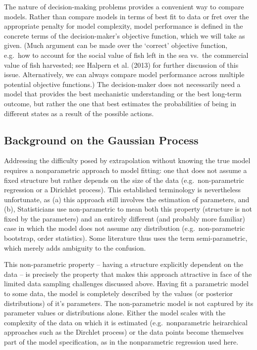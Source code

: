 \documentclass[author-year, review]{elsarticle} %
\begin{document}
The nature of decision-making problems provides a convenient way to
compare models. Rather than compare models in terms of best fit to data
or fret over the appropriate penalty for model complexity, model
performance is defined in the concrete terms of the decision-maker's
objective function, which we will take as given. (Much argument can be
made over the `correct' objective function, e.g.~how to account for the
social value of fish left in the sea vs.~the commercial value of fish
harvested; see Halpern et al. (2013) for further discussion of this
issue. Alternatively, we can always compare model performance across
multiple potential objective functions.) The decision-maker does not
necessarily need a model that provides the best mechanistic
understanding or the best long-term outcome, but rather the one that
best estimates the probabilities of being in different states as a
result of the possible actions.

\subsection{Background on the Gaussian
Process}\label{background-on-the-gaussian-process}

Addressing the difficulty posed by extrapolation without knowing the
true model requires a nonparametric approach to model fitting: one that
does not assume a fixed structure but rather depends on the size of the
data (e.g.~non-parametric regression or a Dirichlet process). This
established terminology is nevertheless unfortunate, as (a) this
approach still involves the estimation of parameters, and (b),
Statisticians use non-parametric to mean both this property (structure
is not fixed by the parameters) and an entirely different (and probably
more familiar) case in which the model does not assume any distribution
(e.g.~non-parametric bootstrap, order statistics). Some literature thus
uses the term semi-parametric, which merely adds ambiguity to the
confusion.

This non-parametric property -- having a structure explicitly dependent
on the data -- is precisely the property that makes this approach
attractive in face of the limited data sampling challenges discussed
above. Having fit a parametric model to some data, the model is
completely described by the values (or posterior distributions) of it's
parameters. The non-parametric model is not captured by its parameter
values or distributions alone. Either the model scales with the
complexity of the data on which it is estimated (e.g.~nonparametric
heirarchical approaches such as the Dirchlet process) or the data points
become themselves part of the model specification, as in the
nonparametric regression used here.
\end{document}
